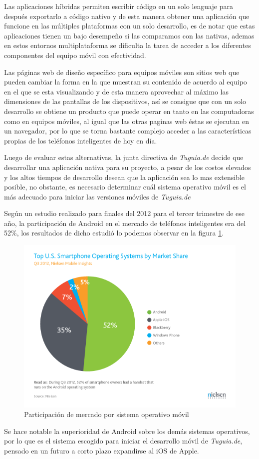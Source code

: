Las aplicaciones híbridas permiten escribir código en un solo lenguaje para después exportarlo a código nativo y de esta manera obtener una aplicación que funcione en las múltiples plataformas con un solo desarrollo, es de notar que estas aplicaciones tienen un bajo desempeño si las comparamos con las nativas, ademas en estos entornos multiplataforma se dificulta la tarea de acceder a los diferentes componentes del equipo móvil con efectividad. 

Las páginas web de diseño específico para equipos móviles son sitios web que pueden cambiar la forma en la que muestran su contenido de acuerdo al equipo en el que se esta visualizando y de esta manera aprovechar al máximo las dimensiones de las pantallas de los dispositivos, así se consigue que con un solo desarrollo se obtiene un producto que puede operar en tanto en las computadoras como en equipos móviles, al igual que las otras paginas web éstas se ejecutan en un navegador, por lo que se torna bastante complejo acceder a las características propias de los teléfonos inteligentes de hoy en día. 

Luego de evaluar estas alternativas, la junta directiva de \textit{Tuguia.de} decide que desarrollar una aplicación nativa para su proyecto, a pesar de los costos elevados y los altos tiempos de desarrollo desean que la aplicación sea lo mas extensible posible, no obstante, es necesario determinar cuál sistema operativo móvil es el más adecuado para iniciar las versiones móviles de \textit{Tuguia.de}

Según un estudio realizado para finales del 2012 \cite{NTD} para el tercer trimestre de ese año, la participación de Android en el mercado de teléfonos inteligentes era del 52\%, los resultados de dicho estudió lo podemos observar en la figura \ref{fig:marketshare}.
   
\begin{figure}[h]
	\begin{center}
		\includegraphics[scale=0.5]{imagenes/Q3-2012-US-Smartphone-OS-market-share.png}
	\end{center}
	\caption{
		\label{fig:marketshare}
		Participación de mercado por sistema operativo móvil \cite{NTD}
	}
\end{figure}

Se hace notable la superioridad de Android sobre los demás sistemas operativos, por lo que es el sistema escogido para iniciar el desarrollo móvil de \textit{Tuguia.de}, pensado en un futuro a corto plazo expandirse al iOS de Apple.
